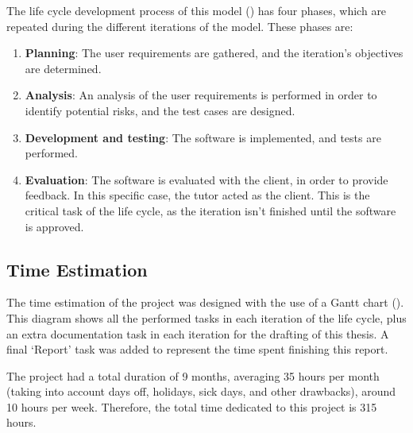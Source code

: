 The life cycle development process of this model () has four phases, which are repeated during the different iterations of the model. These phases are:
\begin{enumerate}
  \item \textbf{Planning}: The user requirements are gathered, and the iteration's objectives are determined.
  \item \textbf{Analysis}: An analysis of the user requirements is performed in order to identify potential risks, and the test cases are designed.
  \item \textbf{Development and testing}: The software is implemented, and tests are performed.
  \item \textbf{Evaluation}: The software is evaluated with the client, in order to provide feedback. In this specific case, the tutor acted as the client. This is the critical task of the life cycle, as the iteration isn't finished until the software is approved.
\end{enumerate}



\subsection{Time Estimation}\label{subsec:time-estimation}
The time estimation of the project was designed with the use of a Gantt chart \parencite{clark1922gantt} (). This diagram shows all the performed tasks in each iteration of the life cycle, plus an extra documentation task in each iteration for the drafting of this thesis. A final `Report' task was added to represent the time spent finishing this report.

The project had a total duration of 9 months, averaging 35 hours per month (taking into account days off, holidays, sick days, and other drawbacks), around 10 hours per week. Therefore, the total time dedicated to this project is 315 hours.


